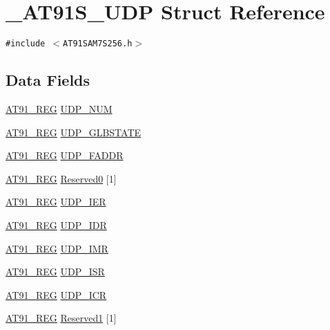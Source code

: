 \hypertarget{struct__AT91S__UDP}{
\section{\_\-AT91S\_\-UDP Struct Reference}
\label{struct__AT91S__UDP}
}
{\tt \#include $<$AT91SAM7S256.h$>$}

\subsection*{Data Fields}
\begin{CompactItemize}
\item 
\hyperlink{AT91SAM7X256_8h_712ad5a1ac1bd02f3e95a7526c283ce1}{AT91\_\-REG} \hyperlink{struct__AT91S__UDP_dc10dbeb36dd030a78d80a0f2f4e1f5c}{UDP\_\-NUM}
\item 
\hyperlink{AT91SAM7X256_8h_712ad5a1ac1bd02f3e95a7526c283ce1}{AT91\_\-REG} \hyperlink{struct__AT91S__UDP_56f35ef281d58bbdde56a5a38750fc2e}{UDP\_\-GLBSTATE}
\item 
\hyperlink{AT91SAM7X256_8h_712ad5a1ac1bd02f3e95a7526c283ce1}{AT91\_\-REG} \hyperlink{struct__AT91S__UDP_b2436c0f24250cfc5f3d5b4cc63b62b9}{UDP\_\-FADDR}
\item 
\hyperlink{AT91SAM7X256_8h_712ad5a1ac1bd02f3e95a7526c283ce1}{AT91\_\-REG} \hyperlink{struct__AT91S__UDP_21ec9d439f9a93d433e51086767e9027}{Reserved0} \mbox{[}1\mbox{]}
\item 
\hyperlink{AT91SAM7X256_8h_712ad5a1ac1bd02f3e95a7526c283ce1}{AT91\_\-REG} \hyperlink{struct__AT91S__UDP_fd91ae40c2301d69f3518adcbddcbd1e}{UDP\_\-IER}
\item 
\hyperlink{AT91SAM7X256_8h_712ad5a1ac1bd02f3e95a7526c283ce1}{AT91\_\-REG} \hyperlink{struct__AT91S__UDP_5487e1dc226d511f8fe09f440ad663b7}{UDP\_\-IDR}
\item 
\hyperlink{AT91SAM7X256_8h_712ad5a1ac1bd02f3e95a7526c283ce1}{AT91\_\-REG} \hyperlink{struct__AT91S__UDP_deaa26682a0a229b8560074ce9030351}{UDP\_\-IMR}
\item 
\hyperlink{AT91SAM7X256_8h_712ad5a1ac1bd02f3e95a7526c283ce1}{AT91\_\-REG} \hyperlink{struct__AT91S__UDP_83b861d5cf938b16d0f9a2b06ad428d9}{UDP\_\-ISR}
\item 
\hyperlink{AT91SAM7X256_8h_712ad5a1ac1bd02f3e95a7526c283ce1}{AT91\_\-REG} \hyperlink{struct__AT91S__UDP_a3b6e0d2334899b4d3c77665b38650ff}{UDP\_\-ICR}
\item 
\hyperlink{AT91SAM7X256_8h_712ad5a1ac1bd02f3e95a7526c283ce1}{AT91\_\-REG} \hyperlink{struct__AT91S__UDP_269c69151e7a68327cfc230b3f694508}{Reserved1} \mbox{[}1\mbox{]}

\end{CompactItemize}
